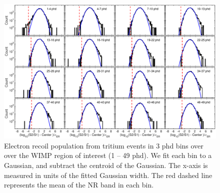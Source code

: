 \onecolumngrid
\break
\begin{figure}
\includegraphics[width=180mm]{fig/Gaussianity/GaussER_all.eps}
\caption{Electron recoil population from tritium events in 3 phd bins over over the WIMP region of interest (1 -- 49 phd). We fit each bin to a Gaussian, and subtract the centroid of the Gaussian. The x-axis is measured in units of the fitted Gaussian width. The red dashed line represents the mean of the NR band in each bin. }
\label{fig:ER-Gauss}
\end{figure}
\twocolumngrid

